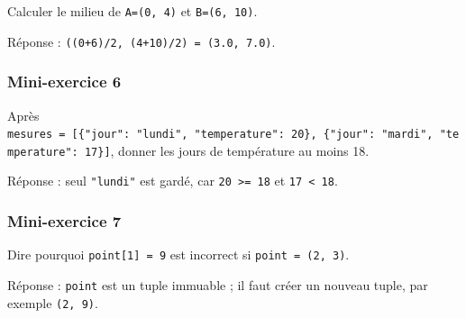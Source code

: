 Calculer le milieu de \texttt{A=(0,\ 4)} et \texttt{B=(6,\ 10)}.

Réponse : \texttt{((0+6)/2,\ (4+10)/2)\ =\ (3.0,\ 7.0)}.

\subsubsection{Mini-exercice 6}

Après
\texttt{mesures\ =\ {[}\{"jour":\ "lundi",\ "temperature":\ 20\},\ \{"jour":\ "mardi",\ "temperature":\ 17\}{]}},
donner les jours de température au moins 18.

Réponse : seul \texttt{"lundi"} est gardé, car
\texttt{20\ \textgreater{}=\ 18} et \texttt{17\ \textless{}\ 18}.

\subsubsection{Mini-exercice 7}

Dire pourquoi \texttt{point{[}1{]}\ =\ 9} est incorrect si
\texttt{point\ =\ (2,\ 3)}.

Réponse : \texttt{point} est un tuple immuable ; il faut créer un
nouveau tuple, par exemple \texttt{(2,\ 9)}.
